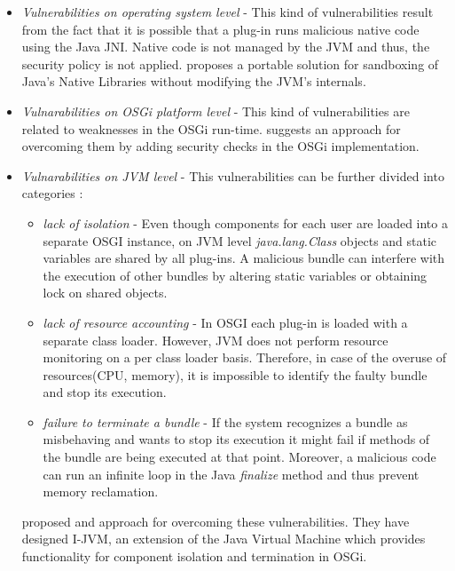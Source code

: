 \begin{itemize}

	\item \textit{Vulnerabilities on operating system level} - This kind of vulnerabilities result from the fact that it is possible that a plug-in runs malicious native code using the Java JNI. Native code is not managed by the JVM and thus, the security policy is not applied. \cite{Sun} proposes a portable solution for sandboxing of Java's Native Libraries without modifying the JVM's internals.
	
	\item \textit{Vulnarabilities on OSGi platform level} - This kind of vulnerabilities are related to weaknesses in the OSGi run-time. \cite{Parrend} suggests an approach for overcoming them by adding security checks in the OSGi implementation.
	
	\item \textit{Vulnarabilities on JVM level} - This vulnerabilities can be further divided into categories \cite{Geoffray}: 
	
	\begin{itemize}
		\item \textit{lack of isolation} - Even though components for each user are loaded into a separate OSGI instance, on JVM level \textit{java.lang.Class} objects and static variables are shared by all plug-ins. A malicious bundle can interfere with the execution of other bundles by altering static variables or obtaining lock on shared objects.
		
		\item \textit{lack of resource accounting} - In OSGI each plug-in is loaded with a separate class loader. However, JVM does not perform resource monitoring on a per class loader basis. Therefore, in case of the overuse of resources(CPU, memory), it is impossible to identify the faulty bundle and stop its execution.
		
		\item \textit{failure to terminate a bundle} -  If the system recognizes a bundle as misbehaving and wants to stop its
execution it might fail if methods of the bundle are being executed at that point. Moreover, a malicious code can run an infinite loop in the Java \textit{finalize} method and thus prevent memory reclamation.
		
	\end{itemize}
	
	\cite{Geoffray} proposed and approach for overcoming these vulnerabilities. They have designed I-JVM, an extension of the Java Virtual Machine which provides functionality for component isolation and termination in OSGi.
	
\end{itemize}

